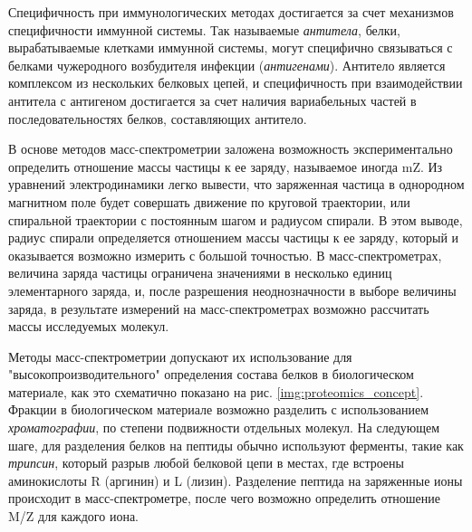 Специфичность при иммунологических методах достигается за счет механизмов специфичности иммунной системы. Так называемые \textit{антитела}, белки, вырабатываемые клетками иммунной системы, могут специфично связываться с белками чужеродного возбудителя инфекции (\textit{антигенами}). Антитело является комплексом из нескольких белковых цепей, и специфичность при взаимодействии антитела с антигеном достигается за счет наличия вариабельных частей в последовательностях белков, составляющих антитело.


В основе методов масс-спектрометрии заложена возможность экспериментально определить отношение массы частицы к ее заряду, называемое иногда mZ. Из уравнений электродинамики легко вывести, что заряженная частица в однородном магнитном поле будет совершать движение по круговой траектории, или спиральной траектории с постоянным шагом и радиусом спирали. В этом выводе, радиус спирали определяется отношением массы частицы к ее заряду, который и оказывается возможно измерить с большой точностью. В масс-спектрометрах, величина заряда частицы ограничена значениями в несколько единиц элементарного заряда, и, после разрешения неоднозначности в выборе величины заряда, в результате измерений на масс-спектрометрах возможно рассчитать массы исследуемых молекул. 

Методы масс-спектрометрии допускают их использование для "высокопроизводительного" определения состава белков в биологическом материале, как это схематично показано на рис. \ref{img:proteomics_concept}. Фракции в биологическом материале возможно разделить с  использованием \textit{хроматографии}, по степени подвижности отдельных молекул. На следующем шаге, для разделения белков на пептиды обычно используют ферменты, такие как \textit{трипсин}, который разрыв любой белковой цепи в местах, где встроены аминокислоты R (аргинин) и L (лизин). Разделение пептида на заряженные ионы происходит в масс-спектрометре, после чего возможно определить отношение M/Z для каждого иона.


